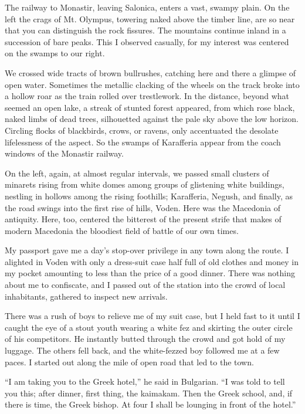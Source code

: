 \documentclass[a5paper,12pt]{book}
\begin{document}
The railway to Monastir, leaving Salonica, enters a vast, swampy plain. On the left the crags of Mt. Olympus, towering naked above the timber line, are so near that you can distinguish the rock fissures. The mountains continue inland in a succession of bare peaks. This I observed casually, for my interest was centered on the swamps to our right.

We crossed wide tracts of brown bullrushes, catching here and there a glimpse of open water. Sometimes the metallic clacking of the wheels on the track broke into a hollow roar as the train rolled over trestlework. In the distance, beyond what seemed an open lake, a streak of stunted forest appeared, from which rose black, naked limbs of dead trees, silhouetted against the pale sky above the low horizon. Circling flocks of blackbirds, crows, or ravens, only accentuated the desolate lifelessness of the aspect. So the swamps of Karafferia appear from the coach windows of the Monastir railway.

On the left, again, at almost regular intervals, we passed small clusters of minarets rising from white domes among groups of glistening white buildings, nestling in hollows among the rising foothills; Karafferia, Negush, and finally, as the road swings into the first rise of hills, Voden. Here was the Macedonia of antiquity. Here, too, centered the bitterest of the present strife that makes of modern Macedonia the bloodiest field of battle of our own times.

My passport gave me a day’s stop-over privilege in any town along the route. I alighted in Voden with only a dress-suit case half full of old clothes and money in my pocket amounting to less than the price of a good dinner. There was nothing about me to confiscate, and I passed out of the station into the crowd of local inhabitants, gathered to inspect new arrivals.

There was a rush of boys to relieve me of my suit case, but I held fast to it until I caught the eye of a stout youth wearing a white fez and skirting the outer circle of his competitors. He instantly butted through the crowd and got hold of my luggage. The others fell back, and the white-fezzed boy followed me at a few paces. I started out along the mile of open road that led to the town.

“I am taking you to the Greek hotel,” he said in Bulgarian. “I was told to tell you this; after dinner, first thing, the kaimakam. Then the Greek school, and, if there is time, the Greek bishop. At four I shall be lounging in front of the hotel.”
\end{document}

